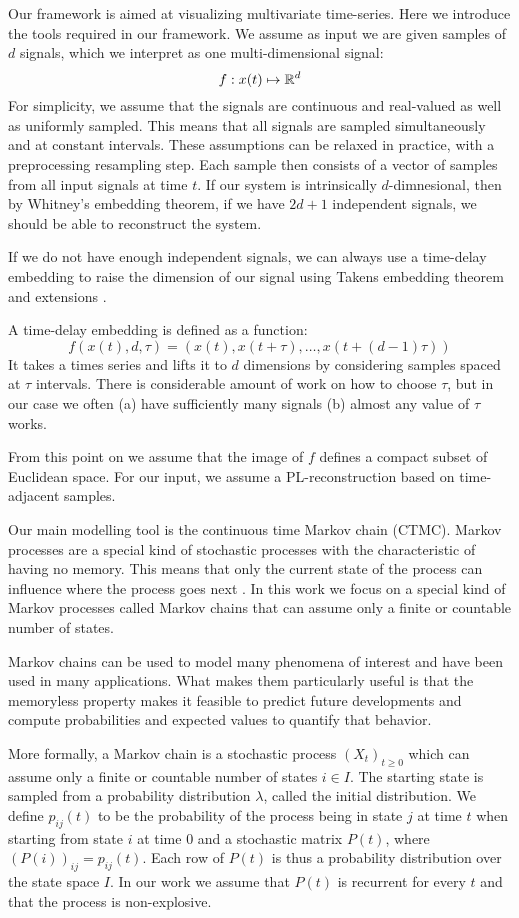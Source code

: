 \label{sec:preliminaries}
Our framework is aimed at visualizing multivariate time-series. Here we introduce the tools required in our framework. We assume as input we are given samples of $d$ signals, which we interpret as one multi-dimensional signal:
$$f: x(t)\mapsto \mathbb{R}^d$$
For simplicity, we assume that the signals are continuous and real-valued as well as uniformly sampled. This means that all signals are sampled simultaneously and at constant intervals. These assumptions can be relaxed in practice, with a preprocessing resampling step.  Each sample then consists of a vector of samples from all input signals at time $t$. If our system is intrinsically $d$-dimnesional, then by Whitney's embedding theorem, if we have $2d+1$ independent signals, we should be able to reconstruct the system.

If we do not have enough independent signals, we can always use a time-delay embedding to raise the dimension of our signal using Takens embedding theorem \cite{} and extensions \cite{}.  

A time-delay embedding is defined as a function:
$$ f(x(t),d,\tau) = (x(t),x(t+\tau),\ldots,x(t+(d-1)\tau) )$$
It takes a times series and lifts it to $d$ dimensions by considering samples spaced at $\tau$ intervals. There is considerable amount of work on how to choose $\tau$, but in our case we often (a) have sufficiently many signals (b) almost any value of $\tau$ works. 

From this point on we  assume that the image of $f$ defines a compact subset of Euclidean space. For our input, we assume a PL-reconstruction based on time-adjacent samples. 

Our main modelling tool is the continuous time Markov chain (CTMC). Markov processes are a special kind of stochastic processes with the characteristic of  	having no memory. This means that only the current state of the process can influence	where the process goes next \cite{norris1998markov}. In this work we focus on a special kind
	of Markov processes called Markov chains that can assume only a finite or countable
	number of states.

Markov chains can be used to model many phenomena of interest and have been used in many
	applications. What makes them particularly useful is that the memoryless
	property makes it feasible to predict future developments and compute probabilities and
	expected values to quantify that behavior.
	
	More formally, a Markov chain is a stochastic process $(X_t)_{t \ge 0}$ which can assume 
	only a finite or countable number of states $i \in I$. The starting state
	is sampled from a probability distribution $\lambda$, called the initial distribution.
	We define $p_{ij}(t)$ to be the probability of the process being in state $j$ at time $t$
	when starting from state $i$ at time $0$ and a stochastic matrix $P(t)$, where $\left(P(i)\right)_{ij} = p_{ij}(t)$.
	Each row of $P(t)$ is thus a probability distribution over the state space $I$. In our
	work we assume that $P(t)$ is recurrent for every $t$ and that the process is non-explosive.
	
